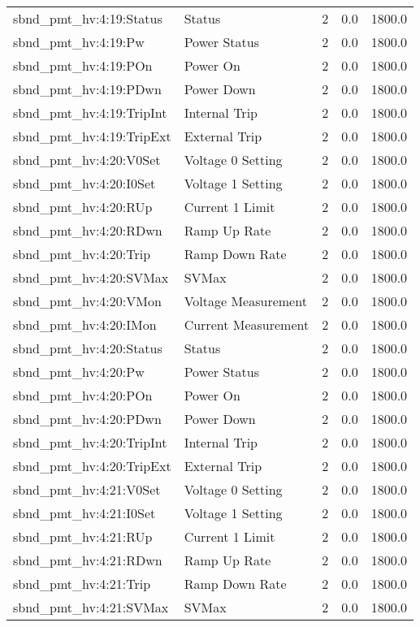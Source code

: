 \begin{center}
\begin{longtable}{l | l l l l }
sbnd\_pmt\_hv:4:19:Status & Status & 2 & 0.0 & 1800.0\\ 
sbnd\_pmt\_hv:4:19:Pw & Power Status & 2 & 0.0 & 1800.0\\ 
sbnd\_pmt\_hv:4:19:POn & Power On & 2 & 0.0 & 1800.0\\ 
sbnd\_pmt\_hv:4:19:PDwn & Power Down & 2 & 0.0 & 1800.0\\ 
sbnd\_pmt\_hv:4:19:TripInt & Internal Trip & 2 & 0.0 & 1800.0\\ 
sbnd\_pmt\_hv:4:19:TripExt & External Trip & 2 & 0.0 & 1800.0\\ 
sbnd\_pmt\_hv:4:20:V0Set & Voltage 0 Setting & 2 & 0.0 & 1800.0\\ 
sbnd\_pmt\_hv:4:20:I0Set & Voltage 1 Setting & 2 & 0.0 & 1800.0\\ 
sbnd\_pmt\_hv:4:20:RUp & Current 1 Limit & 2 & 0.0 & 1800.0\\ 
sbnd\_pmt\_hv:4:20:RDwn & Ramp Up Rate & 2 & 0.0 & 1800.0\\ 
sbnd\_pmt\_hv:4:20:Trip & Ramp Down Rate & 2 & 0.0 & 1800.0\\ 
sbnd\_pmt\_hv:4:20:SVMax & SVMax & 2 & 0.0 & 1800.0\\ 
sbnd\_pmt\_hv:4:20:VMon & Voltage Measurement & 2 & 0.0 & 1800.0\\ 
sbnd\_pmt\_hv:4:20:IMon & Current Measurement & 2 & 0.0 & 1800.0\\ 
sbnd\_pmt\_hv:4:20:Status & Status & 2 & 0.0 & 1800.0\\ 
sbnd\_pmt\_hv:4:20:Pw & Power Status & 2 & 0.0 & 1800.0\\ 
sbnd\_pmt\_hv:4:20:POn & Power On & 2 & 0.0 & 1800.0\\ 
sbnd\_pmt\_hv:4:20:PDwn & Power Down & 2 & 0.0 & 1800.0\\ 
sbnd\_pmt\_hv:4:20:TripInt & Internal Trip & 2 & 0.0 & 1800.0\\ 
sbnd\_pmt\_hv:4:20:TripExt & External Trip & 2 & 0.0 & 1800.0\\ 
sbnd\_pmt\_hv:4:21:V0Set & Voltage 0 Setting & 2 & 0.0 & 1800.0\\ 
sbnd\_pmt\_hv:4:21:I0Set & Voltage 1 Setting & 2 & 0.0 & 1800.0\\ 
sbnd\_pmt\_hv:4:21:RUp & Current 1 Limit & 2 & 0.0 & 1800.0\\ 
sbnd\_pmt\_hv:4:21:RDwn & Ramp Up Rate & 2 & 0.0 & 1800.0\\ 
sbnd\_pmt\_hv:4:21:Trip & Ramp Down Rate & 2 & 0.0 & 1800.0\\ 
sbnd\_pmt\_hv:4:21:SVMax & SVMax & 2 & 0.0 & 1800.0\\ 

\end{longtable}
\end{center}

